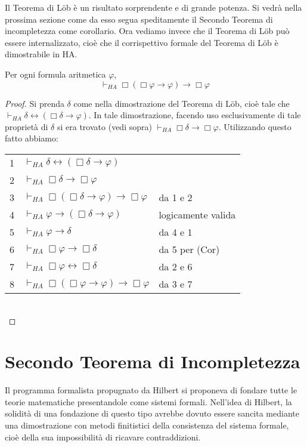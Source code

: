 Il Teorema di L\"ob è un risultato sorprendente e di grande potenza. Si vedrà nella prossima sezione come da esso segua speditamente il Secondo Teorema di incompletezza come corollario. Ora vediamo invece che il Teorema di L\"ob può essere internalizzato, cioè che il corrispettivo formale del Teorema di L\"ob è dimostrabile in HA.

\begin{thm} \label{internalized lob} Per ogni formula aritmetica $\varphi$,
$$\vdash_{HA}\Box(\Box\varphi\to\varphi)\to\Box\varphi$$
\end{thm}

\begin{proof} Si prenda $\delta$ come nella dimostrazione del Teorema di L\"ob, cioè tale che $\vdash_{HA}\delta\leftrightarrow(\Box\delta\to\varphi)$. In tale dimostrazione, facendo uso esclusivamente di tale proprietà di $\delta$ si era trovato (vedi sopra) $\vdash_{HA}\Box\delta\to\Box\varphi$. Utilizzando questo fatto abbiamo:

\begin{tabular}{l l l}
1 & $\vdash_{HA}\delta\leftrightarrow(\Box\delta\to\varphi)$ 														& 									 \\
2 & $\vdash_{HA}\Box\delta\to\Box\varphi$																	& 									 \\
3 & $\vdash_{HA}\Box(\Box\delta\to\varphi)\to\Box\varphi$										&	da 1 e 2\\
4 & $\vdash_{HA}\varphi\to(\Box\delta\to\varphi)$ & logicamente valida\\
5 & $\vdash_{HA}\varphi\to\delta$															&	da 4 e 1\\
6 &	$\vdash_{HA}\Box\varphi\to\Box\delta$																	& da 5 per (Cor)		 \\
7 & $\vdash_{HA}\Box\varphi\leftrightarrow\Box\delta$																& da 2 e 6					 \\
8 & $\vdash_{HA}\Box(\Box\varphi\to\varphi)\to\Box\varphi$										&	da 3 e 7					 \\
\end{tabular}\\

\end{proof}

\section{Secondo Teorema di Incompletezza}

\noindent Il programma formalista propugnato da Hilbert si proponeva di fondare tutte le teorie matematiche presentandole come sistemi formali. Nell'idea di Hilbert, la solidità di una fondazione di questo tipo avrebbe dovuto essere sancita mediante una dimostrazione con metodi finitistici della consistenza del sistema formale, cioè della sua impossibilità di ricavare contraddizioni.

